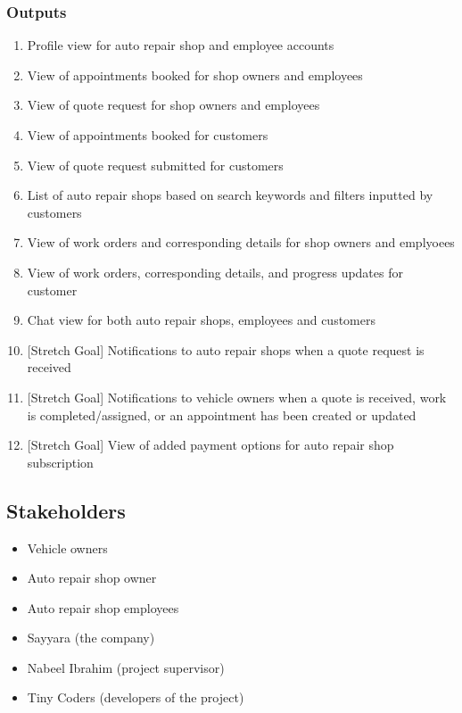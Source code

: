 \documentclass{article}
\begin{document}
\subsubsection{Outputs}
\begin{enumerate}
    \item Profile view for auto repair shop and employee accounts
    \item View of appointments booked for shop owners and employees
    \item View of quote request for shop owners and employees
    \item View of appointments booked for customers
    \item View of quote request submitted for customers
    \item List of auto repair shops based on search keywords and filters inputted by customers
    \item View of work orders and corresponding details for shop owners and emplyoees
    \item View of work orders, corresponding details, and progress updates for customer
    \item Chat view for both auto repair shops, employees and customers
    \item {[Stretch Goal]} Notifications to auto repair shops when a quote request is received
    \item {[Stretch Goal]} Notifications to vehicle owners when a quote is received, work is completed/assigned, 
    or an appointment has been created or updated
    \item {[Stretch Goal]} View of added payment options for auto repair shop subscription
\end{enumerate}

\subsection{Stakeholders}
\begin{itemize}
    \item Vehicle owners
    \item Auto repair shop owner
    \item Auto repair shop employees
    \item Sayyara (the company)
    \item Nabeel Ibrahim (project supervisor)
    \item Tiny Coders (developers of the project)
\end{itemize}
\end{document}

